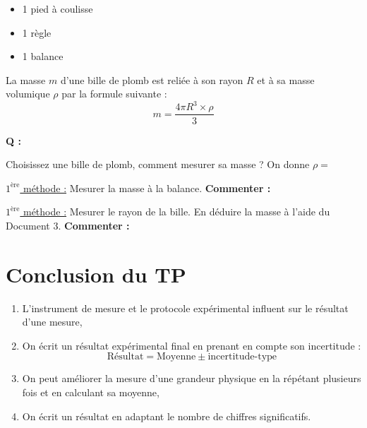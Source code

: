 \begin{mdframed}[style=autreexo]
\textbf{}
\begin{itemize}
    \item 1 pied à coulisse
    \item 1 règle
    \item 1 balance
\end{itemize}
\end{mdframed}

\begin{tcolorbox}[colback=blue!5!white,colframe=white!75!black,title=Document 3 :]La masse $m$ d'une bille de plomb est reliée à son rayon $R$ et à sa masse volumique $\rho$ par la formule suivante :
\begin{equation*}
    m = \frac{4\pi R^3\times\rho}{3}
\end{equation*}
\end{tcolorbox}

\begin{Large}{\textbf{Q :}} \end{Large} Choisissez une bille de plomb, comment mesurer sa masse ? On donne $\rho=$
\newline
\newline

\underline{$1^{\text{ère}}$ méthode :} Mesurer la masse à la balance. \textbf{Commenter :}
\vspace{5cm}

\underline{$1^{\text{ère}}$ méthode :} Mesurer le rayon de la bille. En déduire la masse à l'aide du Document 3. \textbf{Commenter :}


\newpage

\section*{Conclusion du TP}

\begin{tcolorbox}[colback=red!5!white,colframe=red!75!black,title=\textbf{On retiendra : }]
\begin{enumerate}
    \item L'instrument de mesure et le protocole expérimental influent sur le résultat d'une mesure,
    \item On écrit un résultat expérimental final en prenant en compte son incertitude :
    \begin{equation*}
        \text{Résultat} = \text{Moyenne} \pm \text{incertitude-type}
    \end{equation*}
    \item On peut améliorer la mesure d'une grandeur physique en la répétant plusieurs fois et en calculant sa moyenne,
    \item On écrit un résultat en adaptant le nombre de chiffres significatifs.
\end{enumerate}
\end{tcolorbox}
